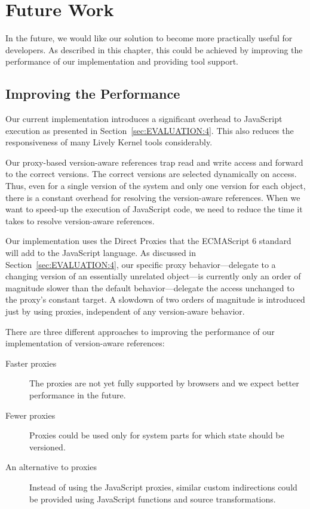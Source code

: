 \chapter{Future Work} \label{chapter:FUTURE_WORK}

In the future, we would like our solution to become more practically useful for developers.
As described in this chapter, this could be achieved by improving the performance of our implementation and providing tool support.

\section{Improving the Performance} \label{sec:FUTURE_WORK:1}

Our current implementation introduces a significant overhead to JavaScript execution as presented in Section~\ref{sec:EVALUATION:4}.
This also reduces the responsiveness of many Lively Kernel tools considerably.

Our proxy-based version-aware references trap read and write access and forward to the correct versions.
The correct versions are selected dynamically on access.
Thus, even for a single version of the system and only one version for each object, there is a constant overhead for resolving the version-aware references.
When we want to speed-up the execution of JavaScript code, we need to reduce the time it takes to resolve version-aware references.

Our implementation uses the Direct Proxies that the ECMAScript 6 standard will add to the JavaScript language.
As discussed in Section~\ref{sec:EVALUATION:4}, our specific proxy behavior---delegate to a changing version of an essentially unrelated object---is currently only an order of magnitude slower than the default behavior---delegate the access unchanged to the proxy's constant target.
A slowdown of two orders of magnitude is introduced just by using proxies, independent of any version-aware behavior.

There are three different approaches to improving the performance of our implementation of version-aware references:

\begin{description}
    \item[Faster proxies] The proxies are not yet fully supported by browsers and we expect better performance in the future.
    \item[Fewer proxies] Proxies could be used only for system parts for which state should be versioned.
    \item[An alternative to proxies] Instead of using the JavaScript proxies, similar custom indirections could be provided using JavaScript functions and source transformations.
\end{description}


